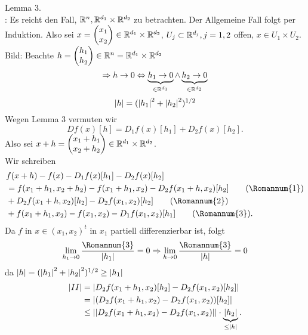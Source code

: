 \documentclass[../ana2.tex]{subfiles}
\begin{document}
\begin{bew}
    \gqq{\( \Rightarrow \)} Lemma 3.\\
    \gqq{\( \Leftrightarrow \)}: Es reicht den Fall, \( \mathbb{R}^n, \mathbb{R}^{d_1} \times \mathbb{R}^{d_2} \) 
    zu betrachten. Der Allgemeine Fall folgt per Induktion. 
    Also sei \( x = \begin{pmatrix} x_1 \\ x_2 \end{pmatrix} \in \mathbb{R}^{d_1} \times \mathbb{R}^{d_2} \), 
    \( U_j \subset \mathbb{R}^{d_j}, j = 1,2 \) offen, \( x \in U_1 \times U_2 \). 
    Bild: 
    Beachte \(h = \begin{pmatrix}
        h_1 \\
        h_2
    \end{pmatrix} \in \mathbb{R}^n = \mathbb{R}^{d_1} \times \mathbb{R}^{d_2} \)
    \[ \Rightarrow h \rightarrow 0 \Leftrightarrow 
    \underbrace{h_1 \rightarrow 0}_{\in \mathbb{R}^{d_1}}
    \wedge \underbrace{h_2 \rightarrow 0}_{\in \mathbb{R}^{d_2}} \]
    \[ \left|h\right| = (\left|h_1\right|^2 + \left|h_2\right|^2)^{1/2} \]
    Wegen Lemma 3 vermuten wir 
    \[ Df(x)[h] = D_1f(x)[h_1] + D_2f(x)[h_2]. \]
    Also sei \( x + h = 
    \begin{pmatrix} x_1 + h_1 \\ x_2 + h_2 \end{pmatrix} 
    \in \mathbb{R}^{d_1} \times \mathbb{R}^{d_2} \).\\
    Wir schreiben 
    \begin{align*}
        &f(x + h) - f(x) - D_1f(x)[h_1] - D_2 f(x)[h_2] \\
        &= f(x_1 + h_1, x_2 + h_2) - f(x_1 + h_1, x_2) 
        - D_2 f(x_1 + h, x_2)[h_2] \tag{\Romannum{1}}\\ 
        &+ D_2 f(x_1 + h, x_2)[h_2] - D_2 f(x_1, x_2)[h_2] \tag{\Romannum{2}} \\
        &+ f(x_1 + h_1, x_2) - f(x_1, x_2) - D_1 f(x_1, x_2)[h_1] \tag{\Romannum{3}}.
    \end{align*}
    Da \(f\) in \(x \in (x_1, x_2)^t\) in \(x_1\) partiell 
    differenzierbar ist, folgt 
    \[ \limesx{h_1}{0} \frac{\Romannum{3}}{\abs{h_1}} = 0 \Rightarrow
    \limesx{h}{0} \frac{\Romannum{3}}{\abs{h}} = 0 \]
    da \( \left|h\right| = (\left|h_1\right|^2 + \left|h_2\right|^2)^{1/2} \geq \left|h_1\right| \)
    \begin{align*}
        \abs{II} &= \abs{ D_2 f(x_1 + h_1, x_2)[h_2] - D_2 f(x_1, x_2)[h_2] } \\
        &= \abs{ (D_2 f(x_1 + h_1, x_2) - D_2 f(x_1, x_2))[h_2] }\\
        &\leq \norm{ D_2 f(x_1 + h_1, x_2) - D_2 f(x_1, x_2) } \cdot \underbrace{\abs{h_2}}_{\leq \abs{h}}.

\end{align*}
\end{bew}
\end{document}
